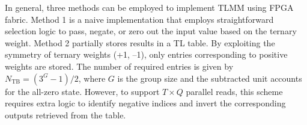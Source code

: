 \documentclass[sigconf]{acmart}
\begin{document}
In general, three methods can be employed to implement TLMM using FPGA fabric.
Method 1 is a naive implementation that employs straightforward selection logic to pass, negate, or zero out the input value based on the ternary weight.
Method 2 partially stores results in a TL table. By exploiting the symmetry of ternary weights (+1, –1), only entries corresponding to positive weights are stored. The number of required entries is given by \( N_{\text{TB}} = (3^G - 1)/2 \), where \( G \) is the group size and the subtracted unit accounts for the all-zero state. However, to support \( T \times Q \) parallel reads, this scheme requires extra logic to identify negative indices and invert the corresponding outputs retrieved from the table.
\end{document}
